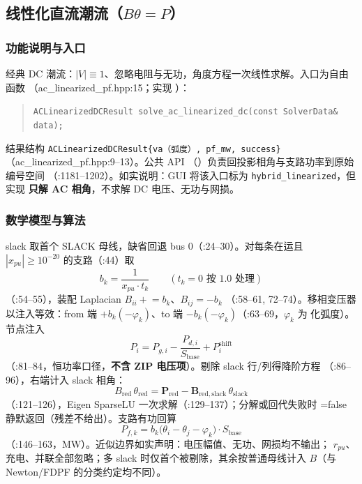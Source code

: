 \subsection{线性化直流潮流（$B\theta=P$）}


\subsubsection*{功能说明与入口}
经典 DC 潮流：$|V|\equiv1$、忽略电阻与无功，角度方程一次线性求解。入口为自由函数
（ac\_linearized\_pf.hpp:15；实现 ）：
\begin{quote}\footnotesize
\texttt{ACLinearizedDCResult solve\_ac\_linearized\_dc(const SolverData\& data);}
\end{quote}
结果结构 \texttt{ACLinearizedDCResult\{va（弧度）, pf\_mw, success\}}
（ac\_linearized\_pf.hpp:9--13）。公共 API 
（）负责回投影相角与支路功率到原始编号空间
（:1181--1202）。如实说明：GUI 将该入口标为 \texttt{hybrid\_linearized}，但实现
\textbf{只解 AC 相角}，不求解 DC 电压、无功与网损。

\subsubsection*{数学模型与算法}
slack 取首个 SLACK 母线，缺省回退 bus 0（:24--30）。对每条在运且
$|x_{pu}|\ge10^{-20}$ 的支路（:44）取
\[
b_k=\frac{1}{x_{pu}\cdot t_k}\qquad(t_k=0\text{ 按 }1.0\text{ 处理})
\]
（:54--55），装配 Laplacian $B_{ii}\mathrel{+}=b_k$、$B_{ij}=-b_k$
（:58--61, 72--74）。移相变压器以注入等效：from 端 $+b_k(-\varphi_k)$、to 端
$-b_k(-\varphi_k)$（:63--69，$\varphi_k$ 为  化弧度）。节点注入
\[
P_i=P_{g,i}-\frac{P_{d,i}}{S_{\mathrm{base}}}+P_i^{\mathrm{shift}}
\]
（:81--84，恒功率口径，\textbf{不含 ZIP 电压项}）。剔除 slack 行/列得降阶方程
（:86--96），右端计入 slack 相角：
\[
B_{\mathrm{red}}\,\theta_{\mathrm{red}}
=\mathbf P_{\mathrm{red}}-\mathbf B_{\mathrm{red,slack}}\,\theta_{\mathrm{slack}}
\]
（:121--126），Eigen SparseLU 一次求解（:129--137）；分解或回代失败时
=false 静默返回（残差不给出）。支路有功回算
\[
P_{f,k}=b_k\big(\theta_i-\theta_j-\varphi_k\big)\cdot S_{\mathrm{base}}
\]
（:146--163，MW）。近似边界如实声明：电压幅值、无功、网损均不输出；
$r_{pu}$、充电、并联全部忽略；多 slack 时仅首个被剔除，其余按普通母线计入
$B$（与 Newton/FDPF 的分类约定均不同）。

